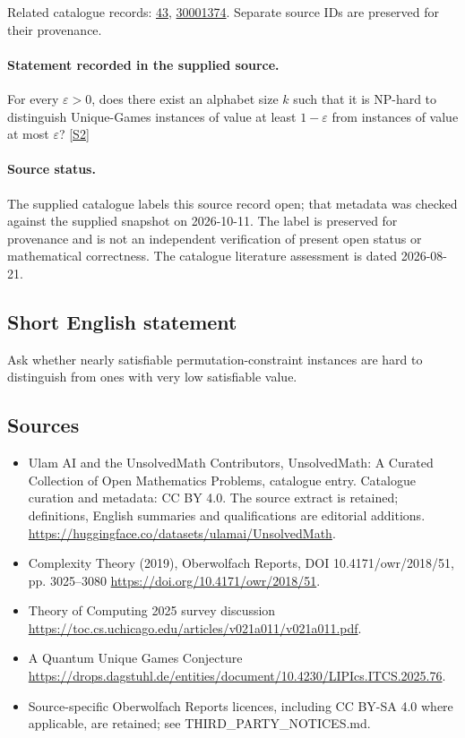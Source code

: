 \documentclass[11pt]{article}
\begin{document}
Related catalogue records: \href{https://mehmetmars7.github.io/Erdosproblems-llm-hunter/problem.html?type=open_problems&id=43}{43}, \href{https://mehmetmars7.github.io/Erdosproblems-llm-hunter/problem.html?type=open_problems&id=30001374}{30001374}. Separate source IDs are preserved for their provenance.
\paragraph{Statement recorded in the supplied source.}
For every $\varepsilon>0$, does there exist an alphabet size $k$ such that it is NP-hard to distinguish Unique-Games instances of value at least $1-\varepsilon$ from instances of value at most $\varepsilon$? \href{https://doi.org/10.4171/owr/2018/51}{[S2]}
\paragraph{Source status.}
The supplied catalogue labels this source record open; that metadata was checked against the supplied snapshot on 2026-10-11. The label is preserved for provenance and is not an independent verification of present open status or mathematical correctness. The catalogue literature assessment is dated 2026-08-21.
\subsection{Short English statement}
Ask whether nearly satisfiable permutation-constraint instances are hard to distinguish from ones with very low satisfiable value.
\subsection{Sources}
\begin{itemize}
\item[S1] Ulam AI and the UnsolvedMath Contributors, UnsolvedMath: A Curated Collection of Open Mathematics Problems, catalogue entry. Catalogue curation and metadata: CC BY 4.0. The source extract is retained; definitions, English summaries and qualifications are editorial additions.
\url{https://huggingface.co/datasets/ulamai/UnsolvedMath}.
\item[S2] Complexity Theory (2019), Oberwolfach Reports, DOI 10.4171/owr/2018/51, pp. 3025--3080
\url{https://doi.org/10.4171/owr/2018/51}.
\item[S3] Theory of Computing 2025 survey discussion
\url{https://toc.cs.uchicago.edu/articles/v021a011/v021a011.pdf}.
\item[S4] A Quantum Unique Games Conjecture
\url{https://drops.dagstuhl.de/entities/document/10.4230/LIPIcs.ITCS.2025.76}.
\item Source-specific Oberwolfach Reports licences, including CC BY-SA 4.0 where applicable, are retained; see THIRD\_PARTY\_NOTICES.md.
\end{itemize}
\end{document}
